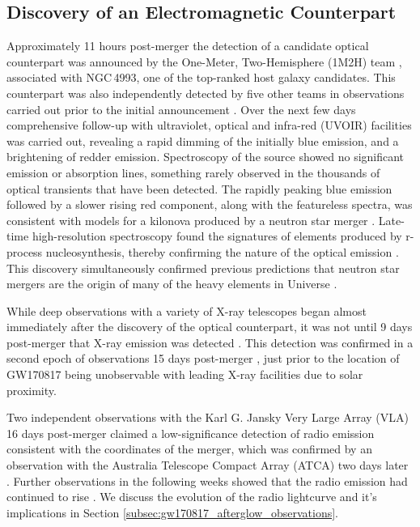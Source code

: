 \subsection{Discovery of an Electromagnetic Counterpart}
Approximately 11 hours post-merger the detection of a candidate optical counterpart was announced by the One-Meter, Two-Hemisphere (1M2H) team \citep{2017Sci...358.1556C}, associated with NGC\,4993, one of the top-ranked host galaxy candidates. This counterpart was also independently detected by five other teams in observations carried out prior to the initial announcement \citep{2017Natur.551...64A,2017ApJ...850L...1L,2017ApJ...848L..16S,2017ApJ...848L..27T,2017ApJ...848L..24V}. Over the next few days comprehensive follow-up with ultraviolet, optical and infra-red (UVOIR) facilities was carried out, revealing a rapid dimming of the initially blue emission, and a brightening of redder emission. Spectroscopy of the source showed no significant emission or absorption lines, something rarely observed in the thousands of optical transients that have been detected. The rapidly peaking blue emission followed by a slower rising red component, along with the featureless spectra, was consistent with models for a kilonova produced by a neutron star merger \citep{2015NatPh..11.1042H,2015MNRAS.450.1777K,2015MNRAS.446.1115M,2016ApJ...829..110B}. Late-time high-resolution spectroscopy found the signatures of elements produced by r-process nucleosynthesis, thereby confirming the nature of the optical emission \citep{2017ApJ...848L..19C,2017Sci...358.1559K,2017Natur.551...67P}. This discovery simultaneously confirmed previous predictions that neutron star mergers are the origin of many of the heavy elements in Universe \citep{1974ApJ...192L.145L,1982ApL....22..143S,1999ApJ...516..381F}.

While deep observations with a variety of X-ray telescopes began almost immediately after the discovery of the optical counterpart, it was not until 9 days post-merger that X-ray emission was detected \citep{2017Natur.551...71T}. This detection was confirmed in a second epoch of observations 15 days post-merger \citep{2017ApJ...848L..25H,2017Natur.551...71T}, just prior to the location of GW170817 being unobservable with leading X-ray facilities due to solar proximity.

Two independent observations with the Karl G. Jansky Very Large Array (VLA) 16 days post-merger claimed a low-significance detection of radio emission consistent with the coordinates of the merger, which was confirmed by an observation with the Australia Telescope Compact Array (ATCA) two days later \citep{2017Sci...358.1579H}. Further observations in the following weeks showed that the radio emission had continued to rise \citep{2017ApJ...848L..21A,2017Sci...358.1579H}. We discuss the evolution of the radio lightcurve and it's implications in Section \ref{subsec:gw170817_afterglow_observations}.


